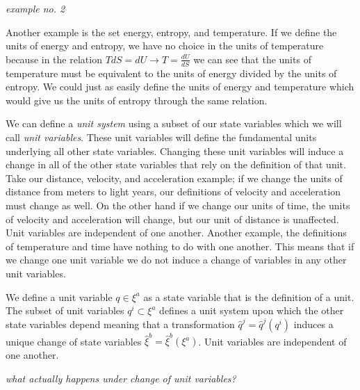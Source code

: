 \documentclass{article}
\begin{document}
	\emph{example no. 2}
	
	Another example is the set energy, entropy, and temperature. If we define the units of energy and entropy, we have no choice in the units of temperature because in the relation $T dS = dU \to T = \frac{dU}{dS}$ we can see that the units of temperature must be equivalent to the units of energy divided by the units of entropy. We could just as easily define the units of energy and temperature which would give us the units of entropy through the same relation.
	
	 We can define a \textit{unit system} using a subset of our state variables which we will call \textit{unit variables}. These unit variables will define the fundamental units underlying all other state variables. Changing these unit variables will induce a change in all of the other state variables that rely on the definition of that unit. Take our distance, velocity, and acceleration example; if we change the units of distance from meters to light years, our definitions of velocity and acceleration must change as well. On the other hand if we change our units of time, the units of velocity and acceleration will change, but our unit of distance is unaffected. Unit variables are independent of one another. Another example, the definitions of temperature and time have nothing to do with one another. This means that if we change one unit variable we do not induce a change of variables in any other unit variables.

\begin{defn}
	We define a unit variable $q \in \xi^a$ as a state variable that is the definition of a unit. The subset of unit variables $q^i \subset \xi^a$ defines a unit system upon which the other state variables depend meaning that a transformation $\hat{q}^j = \hat{q}^j(q^i)$ induces a unique change of state variables $\hat{\xi}^b = \hat{\xi}^b(\xi^a)$. Unit variables are independent of one another.
\end{defn}

	\emph{what actually happens under change of unit variables?}
	
\end{document}
